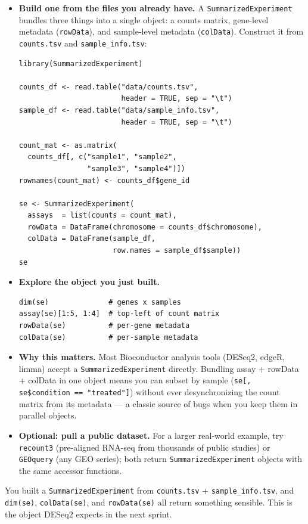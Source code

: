 \begin{itemize}[nosep]
  \item \textbf{Build one from the files you already have.} A \texttt{SummarizedExperiment} bundles three things into a single object: a counts matrix, gene-level metadata (\texttt{rowData}), and sample-level metadata (\texttt{colData}). Construct it from \texttt{counts.tsv} and \texttt{sample\_info.tsv}:
    \begin{lstlisting}
library(SummarizedExperiment)

counts_df <- read.table("data/counts.tsv",
                        header = TRUE, sep = "\t")
sample_df <- read.table("data/sample_info.tsv",
                        header = TRUE, sep = "\t")

count_mat <- as.matrix(
  counts_df[, c("sample1", "sample2",
                "sample3", "sample4")])
rownames(count_mat) <- counts_df$gene_id

se <- SummarizedExperiment(
  assays  = list(counts = count_mat),
  rowData = DataFrame(chromosome = counts_df$chromosome),
  colData = DataFrame(sample_df,
                      row.names = sample_df$sample))
se
    \end{lstlisting}
  \item \textbf{Explore the object you just built.}
    \begin{lstlisting}
dim(se)              # genes x samples
assay(se)[1:5, 1:4]  # top-left of count matrix
rowData(se)          # per-gene metadata
colData(se)          # per-sample metadata
    \end{lstlisting}
  \item \textbf{Why this matters.} Most Bioconductor analysis tools (DESeq2, edgeR, limma) accept a \texttt{SummarizedExperiment} directly. Bundling assay + rowData + colData in one object means you can subset by sample (\texttt{se[, se\$condition == "treated"]}) without ever desynchronizing the count matrix from its metadata --- a classic source of bugs when you keep them in parallel objects.
  \item \textbf{Optional: pull a public dataset.} For a larger real-world example, try \texttt{recount3} (pre-aligned RNA-seq from thousands of public studies) or \texttt{GEOquery} (any GEO series); both return \texttt{SummarizedExperiment} objects with the same accessor functions.
\end{itemize}
\begin{winbox}[Checkpoint]
You built a \texttt{SummarizedExperiment} from \texttt{counts.tsv} + \texttt{sample\_info.tsv}, and \texttt{dim(se)}, \texttt{colData(se)}, and \texttt{rowData(se)} all return something sensible. This is the object DESeq2 expects in the next sprint.
\end{winbox}


